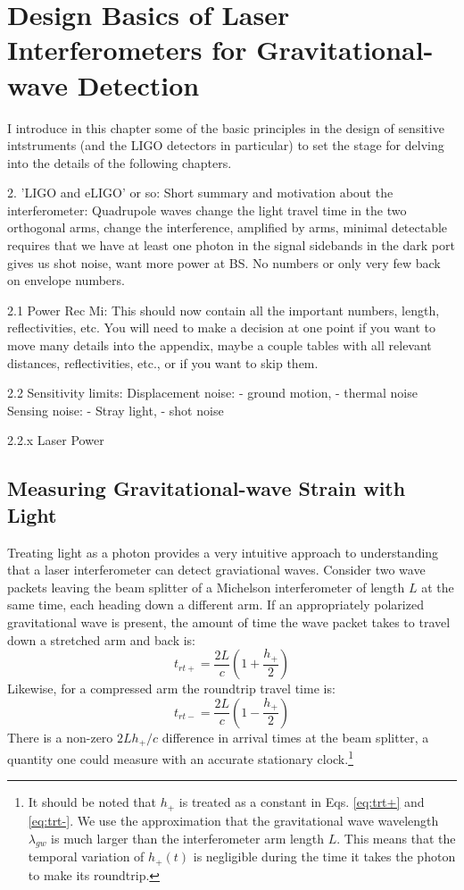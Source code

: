 \chapter{Design Basics of Laser Interferometers for Gravitational-wave Detection}
I introduce in this chapter some of the basic principles in the
design of sensitive intstruments (and the LIGO detectors in
particular) to set the stage for delving into the details of the
following chapters. 



2. 'LIGO and eLIGO' or so:
Short summary and motivation about the interferometer: Quadrupole
waves change the light travel time in the two orthogonal arms, change
the interference, amplified by arms, minimal detectable requires that
we have at least one photon in the signal sidebands in the dark port
gives us shot noise, want more power at BS. No numbers or only very
few back on envelope numbers.

2.1 Power Rec Mi: This should now contain all the important numbers,
length, reflectivities, etc. You will need to make a decision at one
point if you want to move many details into the appendix, maybe a
couple tables with all relevant distances, reflectivities, etc., or if
you want to skip them.

2.2 Sensitivity limits:
Displacement noise:
- ground motion, 
- thermal noise
Sensing noise:
- Stray light,
- shot noise

2.2.x Laser Power




\section{Measuring Gravitational-wave Strain with Light}
Treating light as a photon provides a very intuitive approach to
understanding that a laser interferometer can detect graviational
waves. Consider two wave packets leaving the beam splitter of a
Michelson interferometer of length $L$ at the same time, each heading
down a different arm. If an appropriately polarized gravitational wave
is present, the amount of time the wave packet takes to travel down a
stretched arm and back is:
\begin{equation}
t_{rt+} = \frac{2 L}{c} \left( 1 + \frac{h_+}{2} \right)
\label{eq:trt+} 
\end{equation}
Likewise, for a compressed arm the roundtrip travel time is:
\begin{equation}
t_{rt-} = \frac{2 L}{c} \left( 1 - \frac{h_+}{2} \right)
\label{eq:trt-} 
\end{equation}
There is a non-zero $2Lh_+/c$ difference in arrival times at the beam
splitter, a quantity one could measure with an accurate stationary
clock.\footnote{It should be noted that $h_+$ is treated as a constant
  in Eqs. \ref{eq:trt+} and \ref{eq:trt-}. We use the approximation
  that the gravitational wave wavelength $\lambda_{gw}$ is much larger
  than the interferometer arm length $L$. This means that the temporal
  variation of $h_+(t)$ is negligible during the time it takes the
  photon to make its roundtrip.}

